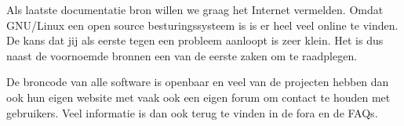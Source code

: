 Als laatste documentatie bron willen we graag het Internet vermelden. Omdat GNU/Linux een open source besturingssysteem
is is er heel veel online te vinden. De kans dat jij als eerste tegen een probleem aanloopt is zeer klein. Het is dus
naast de voornoemde bronnen een van de eerste zaken om te raadplegen.

De broncode van alle software is openbaar en veel van de projecten hebben dan ook hun eigen website met vaak ook een
eigen forum om contact te houden met gebruikers. Veel informatie is dan ook terug te vinden in de fora en de FAQs.
